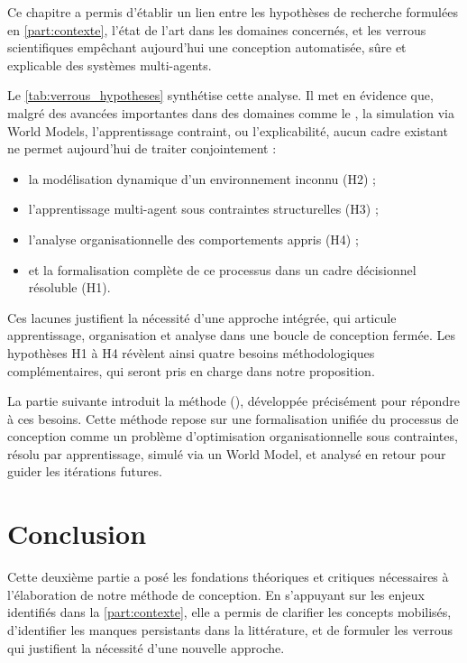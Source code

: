 \noindent
Ce chapitre a permis d'établir un lien entre les hypothèses de recherche formulées en \autoref{part:contexte}, l'état de l'art dans les domaines concernés, et les verrous scientifiques empêchant aujourd'hui une conception automatisée, sûre et explicable des systèmes multi-agents.

\medskip

\noindent
Le \autoref{tab:verrous_hypotheses} synthétise cette analyse. Il met en évidence que, malgré des avancées importantes dans des domaines comme le , la simulation via World Models, l'apprentissage contraint, ou l'explicabilité, aucun cadre existant ne permet aujourd'hui de traiter conjointement :
\begin{itemize}
    \item la modélisation dynamique d'un environnement inconnu (H2) ;
    \item l'apprentissage multi-agent sous contraintes structurelles (H3) ;
    \item l'analyse organisationnelle des comportements appris (H4) ;
    \item et la formalisation complète de ce processus dans un cadre décisionnel résoluble (H1).
\end{itemize}

\noindent
Ces lacunes justifient la nécessité d'une approche intégrée, qui articule apprentissage, organisation et analyse dans une boucle de conception fermée. Les hypothèses H1 à H4 révèlent ainsi quatre besoins méthodologiques complémentaires, qui seront pris en charge dans notre proposition.

\medskip

\noindent
La partie suivante introduit la méthode \textbf{} (), développée précisément pour répondre à ces besoins. Cette méthode repose sur une formalisation unifiée du processus de conception comme un problème d'optimisation organisationnelle sous contraintes, résolu par apprentissage, simulé via un World Model, et analysé en retour pour guider les itérations futures.





\chapter*{Conclusion}

\noindent
Cette deuxième partie a posé les fondations théoriques et critiques nécessaires à l'élaboration de notre méthode de conception. En s'appuyant sur les enjeux identifiés dans la \autoref{part:contexte}, elle a permis de clarifier les concepts mobilisés, d'identifier les manques persistants dans la littérature, et de formuler les verrous qui justifient la nécessité d'une nouvelle approche.

